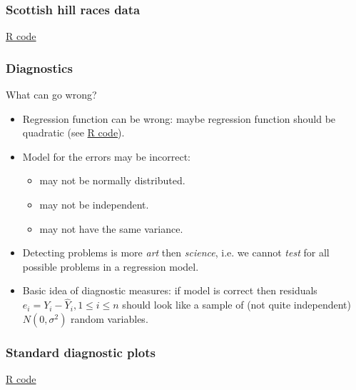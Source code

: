 \documentclass[handout]{beamer}
\newcommand{\basename}[1]{http://stats191.stanford.edu/#1}
\newcommand{\mycolor}[1]{{\color{blue} #1}}
\newcommand{\Rhref}[2]{\href{\basename{R/#1}}{\mycolor{#2}}}
\begin{document}
   \begin{frame}
   \frametitle{Scottish hill races data}
   \begin{center}
   \end{center}
   \href{http://stats191.stanford.edu/diagnostics.html#scottish-hill-races}{R code}
   \end{frame}


   \begin{frame} \frametitle{Diagnostics}

   \begin{block}
   {What can go wrong?}

   \begin{itemize}[<+->]

   \item
   Regression function can be wrong: maybe regression function should be quadratic
   (see \Rhref{simple_diagnostics/anscombeout.html}{R code}).

   \item Model for the errors
   may be incorrect:
   \begin{itemize}
   \item  may not be normally distributed.
   \item  may not be independent.

   \item  may not have the same variance.
   \end{itemize}

   \item Detecting problems is more {\em art} then {\em science}, i.e.
   we cannot {\em test} for all possible problems in a regression model.

   \item Basic idea of diagnostic measures: if model is correct then
   residuals $e_i = Y_i -\widehat{Y}_i, 1 \leq i \leq n$ should look like a sample of
   (not quite independent) $N(0, \sigma^2)$ random variables.
   \end{itemize}
   \end{block}
   \end{frame}



   \begin{frame}
   \frametitle{Standard diagnostic plots}
   \begin{center}
   \end{center}
   \href{http://stats191.stanford.edu/diagnostics.html#standard-diagnostic-plots}{R code}
   \end{frame}
\end{document}

